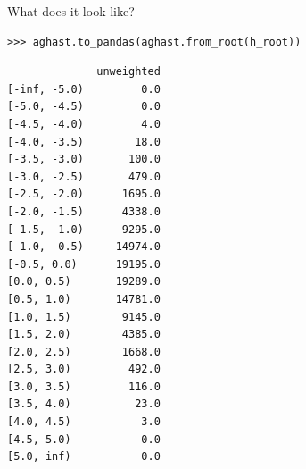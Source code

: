 \documentclass[aspectratio=169]{beamer}
\begin{document}
\begin{frame}[fragile]{What does it look like?}
\vspace{0.5 cm}
\small
\begin{verbatim}
>>> aghast.to_pandas(aghast.from_root(h_root))
\end{verbatim}

\tiny
\begin{verbatim}
              unweighted
[-inf, -5.0)         0.0
[-5.0, -4.5)         0.0
[-4.5, -4.0)         4.0
[-4.0, -3.5)        18.0
[-3.5, -3.0)       100.0
[-3.0, -2.5)       479.0
[-2.5, -2.0)      1695.0
[-2.0, -1.5)      4338.0
[-1.5, -1.0)      9295.0
[-1.0, -0.5)     14974.0
[-0.5, 0.0)      19195.0
[0.0, 0.5)       19289.0
[0.5, 1.0)       14781.0
[1.0, 1.5)        9145.0
[1.5, 2.0)        4385.0
[2.0, 2.5)        1668.0
[2.5, 3.0)         492.0
[3.0, 3.5)         116.0
[3.5, 4.0)          23.0
[4.0, 4.5)           3.0
[4.5, 5.0)           0.0
[5.0, inf)           0.0
\end{verbatim}
\end{frame}

\end{document}
